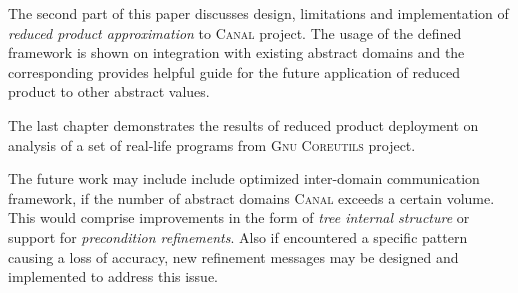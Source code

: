 \documentclass[12pt,oneside]{fithesis2}
\theoremstyle{definition}
\begin{document}
The second part of this paper discusses design, limitations and implementation of \textit{reduced product approximation} to \textsc{Canal} project. The usage of the defined framework is shown on integration with existing abstract domains and the corresponding provides helpful guide for the future application of reduced product to other abstract values.

The last chapter demonstrates the results of reduced product deployment on analysis of a set of real-life programs from \textsc{Gnu Coreutils} project.

The future work may include include optimized inter-domain communication framework, if the number of abstract domains \textsc{Canal} exceeds a certain volume. This would comprise improvements in the form of \textit{tree internal structure} or support for \textit{precondition refinements}. Also if encountered a specific pattern causing a loss of accuracy, new refinement messages may be designed and implemented to address this issue.



\end{document}

